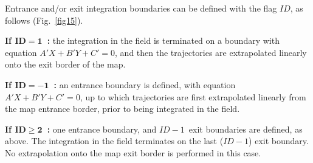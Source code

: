 \bigskip

\noindent Entrance and/or exit integration boundaries can be defined with 
the flag $ID$, as follows (Fig.~\ref{fig15}).
\bigskip

\noindent \textbf{If  $\mathbf{ID = 1}$~:} the integration in the field 
is terminated on a boundary with equation $A'X + B'Y + C'=0 $, and 
then the trajectories are extrapolated linearly onto the exit border of the map.

\medskip

\noindent \textbf{If  $\mathbf{ID = -1}$~:} an entrance boundary is 
defined, with equation $A'X + B'Y + C'=0 $, up to which  trajectories are 
first extrapolated linearly from the map entrance border, prior to being 
integrated in the field.

\medskip

\noindent \textbf{If  $\mathbf{ID \geq 2}$~:} one entrance boundary, and 
$ID-1$~exit boundaries are defined, as above. The integration in the 
field terminates on the last ($ID - 1$) exit boundary. No extrapolation onto 
the map exit  border is performed in this case.

\newpage

